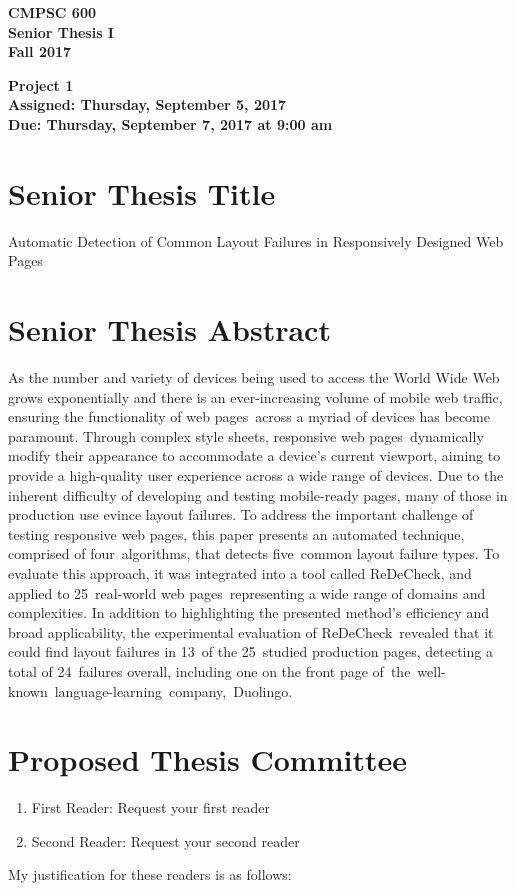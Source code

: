 \documentclass[11pt]{article}
\newcommand{\assignmentduedate}{September 7}
\newcommand{\assignmentassignedate}{September 5}
\newcommand{\labyear}{2017}
\newcommand{\labday}{Thursday}
\newcommand{\labtime}{9:00 am}
\newcommand{\assigneddate}{Assigned: \labday, \assignmentassignedate, \labyear{}}
\newcommand{\duedate}{Due: \labday, \assignmentduedate, \labyear{} at \labtime{}}
\newcommand{\projecttitle}[1]
{
  \begin{center}
    \begin{center}
      \bf
      CMPSC 600\\Senior Thesis I\\
      Fall 2017\\
      \medskip
    \end{center}
    \bf
    #1
  \end{center}
}
\newcommand{\webpages}{web pages\xspace}
\newcommand{\stylesheets}{style sheets\xspace}
\newcommand{\numtypes}{five\xspace}
\newcommand{\numalgorithms}{four\xspace}
\newcommand{\numsubjects}{25\xspace}
\newcommand{\totalfailures}{24\xspace}
\newcommand{\numpageswithfailures}{13\xspace}
\newcommand{\redecheck}{{\sc ReDeCheck}\xspace}
\begin{document}
\thispagestyle{empty}

\projecttitle{Project 1 \\ \assigneddate{} \\ \duedate{}}

\section*{Senior Thesis Title}

\noindent
Automatic Detection of Common Layout Failures in Responsively Designed Web Pages

\section*{Senior Thesis Abstract}

As the number and variety of devices being used to access the World Wide Web grows exponentially and there is an
ever-increasing volume of mobile web traffic, ensuring the functionality of \webpages~across a myriad of devices has
become paramount. Through complex \stylesheets, responsive \webpages~dynamically modify their appearance to
accommodate a device's current viewport, aiming to provide a high-quality user experience across a wide range of
devices. Due to the inherent difficulty of developing and testing mobile-ready pages, many of those in production use
evince layout failures. To address the important challenge of testing responsive \webpages, this paper presents an
automated technique, comprised of \numalgorithms~algorithms, that detects \numtypes~common layout failure types. To
evaluate this approach, it was integrated into a tool called \mbox{\redecheck}, and applied to \numsubjects~real-world
\webpages~representing a wide range of domains and complexities. In addition to highlighting the presented method's
efficiency and broad applicability, the experimental evaluation of \redecheck~revealed that it could find layout
failures in \numpageswithfailures~of the \numsubjects~studied production pages, detecting a total of
\totalfailures~failures overall, including one on the front page of~\mbox{the well-known language-learning company,
Duolingo}.

\section*{Proposed Thesis Committee}

\begin{enumerate}
  \item First Reader: Request your first reader
  \item Second Reader: Request your second reader
\end{enumerate}

\noindent
My justification for these readers is as follows:
\end{document}
